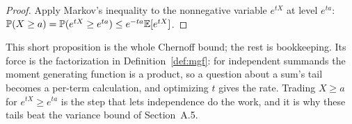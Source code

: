 \begin{proof}
Apply Markov's inequality to the nonnegative variable $e^{tX}$ at level $e^{ta}$:
$\mathbb{P}(X\ge a)=\mathbb{P}(e^{tX}\ge e^{ta})\le e^{-ta}\mathbb{E}[e^{tX}]$.
\end{proof}

\begin{insight}
This short proposition is the whole Chernoff bound; the rest is bookkeeping. Its
force is the factorization in Definition~\ref{def:mgf}: for independent summands
the moment generating function is a product, so a question about a sum's tail
becomes a per-term calculation, and optimizing $t$ gives the rate. Trading
$X\ge a$ for $e^{tX}\ge e^{ta}$ is the step that lets independence do the work,
and it is why these tails beat the variance bound of Section~A.5.
\end{insight}
